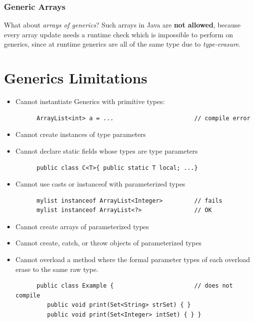 \subsubsection{Generic Arrays}
What about \textit{arrays of generics}?
Such arrays in Java are \textbf{not allowed},
because every array update needs a runtime check which is impossible to perform on generics,
since at runtime generics are all of the same type due to \textit{type-erasure}.


\section{Generics Limitations}
\begin{itemize}
   \item Cannot instantiate Generics with primitive types:
   \begin{lstlisting}
      ArrayList<int> a = ...                       // compile error
   \end{lstlisting}
   \item Cannot create instances of type parameters
   \item Cannot declare static fields whose types are type parameters
   \begin{lstlisting}
      public class C<T>{ public static T local; ...}
   \end{lstlisting}
   \item Cannot use casts or instanceof with parameterized types
   \begin{lstlisting}
      mylist instanceof ArrayList<Integer>         // fails
      mylist instanceof ArrayList<?>               // OK
   \end{lstlisting}
   \item Cannot create arrays of parameterized types
   \item Cannot create, catch, or throw objects of parameterized types
   \item Cannot overload a method where the formal parameter types of each overload erase to the same raw type.
   \begin{lstlisting}
      public class Example {                       // does not compile
         public void print(Set<String> strSet) { }
         public void print(Set<Integer> intSet) { } }
   \end{lstlisting}
\end{itemize}

